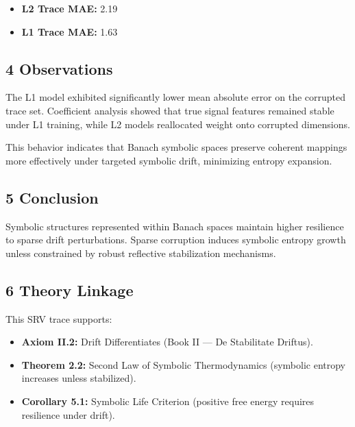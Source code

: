 \begin{itemize}
    \item \textbf{L2 Trace MAE:} 2.19
    \item \textbf{L1 Trace MAE:} 1.63
\end{itemize}

\subsection*{4 Observations}
\label{subsection:trace2_observations}

The L1 model exhibited significantly lower mean absolute error on the corrupted trace set. Coefficient analysis showed that true signal features remained stable under L1 training, while L2 models reallocated weight onto corrupted dimensions.

This behavior indicates that Banach symbolic spaces preserve coherent mappings more effectively under targeted symbolic drift, minimizing entropy expansion.

\subsection*{5 Conclusion}
\label{subsection:trace2_conclusion}

Symbolic structures represented within Banach spaces maintain higher resilience to sparse drift perturbations. Sparse corruption induces symbolic entropy growth unless constrained by robust reflective stabilization mechanisms.

\subsection*{6 Theory Linkage}
\label{subsection:trace2_theory_linkage}

This SRV trace supports:
\begin{itemize}
    \item \textbf{Axiom II.2:} Drift Differentiates (Book II — De Stabilitate Driftus).
    \item \textbf{Theorem 2.2:} Second Law of Symbolic Thermodynamics (symbolic entropy increases unless stabilized).
    \item \textbf{Corollary 5.1:} Symbolic Life Criterion (positive free energy requires resilience under drift).
\end{itemize}
